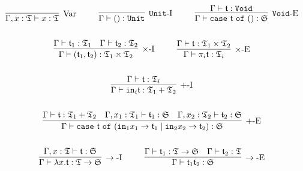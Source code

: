 \begin{gather*}
\infer[\mbox{Var}]{\Gamma, x: \T \vdash x : \T}{}
~~~~ ~~~~
\infer[\mathtt{Unit}\mbox{-I}]{\Gamma \vdash () : \mathtt{Unit}}{}
~~~~ ~~~~
\infer[\mathtt{Void}\mbox{-E}]{\Gamma \vdash \mathtt{case}~\t~\mathtt{of}~() : \mathfrak{S}}{\Gamma \vdash \t : \mathtt{Void}}
\\ \\ 
\infer[\times\mbox{-I}]{\Gamma \vdash (\t_1, \t_2) : \T_1 \times \T_2}{\Gamma \vdash \t_1 : \T_1 & \Gamma \vdash \t_2 : \T_2}
~~~~ ~~~~
\infer[\times\mbox{-E}]{\Gamma \vdash \pi_i \t : \T_i}{\Gamma \vdash \t : \T_1 \times \T_2}
\\ \\ 
\infer[+\mbox{-I}]{\Gamma \vdash \mathtt{in}_i \t : \T_1 + \T_2}{\Gamma \vdash \t : \T_i}
\\ \\
\infer[+\mbox{-E}]{\Gamma \vdash \mathtt{case}~\t~\mathtt{of}~(\mathtt{in}_1 x_1 \rightarrow \t_1 \mid \mathtt{in}_2 x_2 \rightarrow \t_2) : \mathfrak{S}}{
    \Gamma \vdash \t : \T_1 + \T_2
    &
    \Gamma, x_1 : \T_1 \vdash \t_1 : \mathfrak{S}
    &
    \Gamma, x_2 : \T_2 \vdash \t_2 : \mathfrak{S}
}
\\ \\
\infer[\rightarrow\mbox{-I}]{\Gamma \vdash \lambda x. \t : \T \rightarrow \mathfrak{S}}{\Gamma, x : \T \vdash \t : \mathfrak{S}}
~~~~ ~~~~
\infer[\rightarrow\mbox{-E}]{\Gamma \vdash \t_1\t_2 : \mathfrak{S}}{
    \Gamma \vdash \t_1 : \T \rightarrow \mathfrak{S}
    &
    \Gamma \vdash \t_2 : \T
}
\end{gather*}

